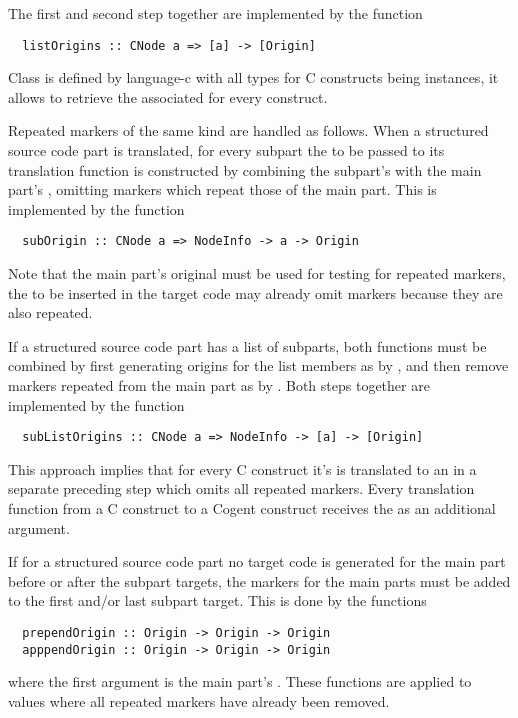 The first and second step together are implemented by the function
\begin{verbatim}
  listOrigins :: CNode a => [a] -> [Origin]
\end{verbatim}
Class  is defined by language-c with all types for C constructs being instances, it allows to retrieve the 
associated  for every construct.

Repeated markers of the same kind are handled as follows. When a structured source code part is translated, for every
subpart the  to be passed to its translation function is constructed by combining the subpart's 
 with the main part's , omitting markers which repeat those of the main part. 
This is implemented by the function
\begin{verbatim}
  subOrigin :: CNode a => NodeInfo -> a -> Origin
\end{verbatim}
Note that the main part's original  must be used for testing for repeated markers, the  
to be inserted in the target code may already omit markers because they are also repeated.

If a structured source code part has a list of subparts, both functions must be combined by first generating origins 
for the list members as by , and then remove markers repeated from the main part as by .
Both steps together are implemented by the function
\begin{verbatim}
  subListOrigins :: CNode a => NodeInfo -> [a] -> [Origin]
\end{verbatim}

This approach implies that for every C construct it's  is translated to an  in a separate preceding 
step which omits all repeated markers. Every translation function from a C construct to a Cogent construct receives 
the  as an additional argument.

If for a structured source code part no target code is generated for the main part before or after the subpart targets, the markers
for the main parts must be added to the first and/or last subpart target. This is done by the functions
\begin{verbatim}
  prependOrigin :: Origin -> Origin -> Origin
  apppendOrigin :: Origin -> Origin -> Origin
\end{verbatim}
where the first argument is the main part's . These functions are applied to  values where all repeated 
markers have already been removed.

